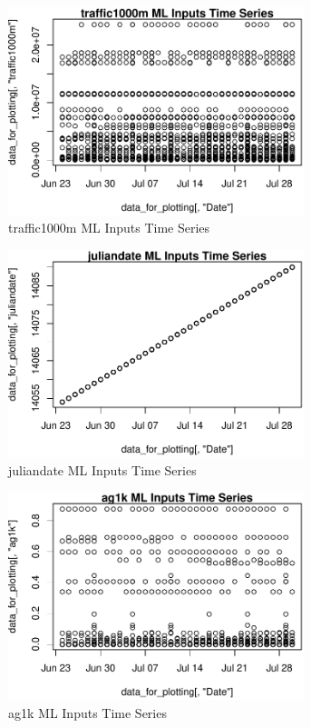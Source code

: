 \begin{figure} 
\centering  
\includegraphics[width=0.77\textwidth]{Code_Outputs/ML_input_report_AllforCaret_cleaned_StepPractice_part_practice_traffic1000mTS.pdf} 
\caption{\label{fig:ML_input_report_AllforCaret_cleaned_StepPractice_part_practicetraffic1000mTS}traffic1000m ML Inputs Time Series} 
\end{figure} 
 

\begin{figure} 
\centering  
\includegraphics[width=0.77\textwidth]{Code_Outputs/ML_input_report_AllforCaret_cleaned_StepPractice_part_practice_juliandateTS.pdf} 
\caption{\label{fig:ML_input_report_AllforCaret_cleaned_StepPractice_part_practicejuliandateTS}juliandate ML Inputs Time Series} 
\end{figure} 
 

\begin{figure} 
\centering  
\includegraphics[width=0.77\textwidth]{Code_Outputs/ML_input_report_AllforCaret_cleaned_StepPractice_part_practice_ag1kTS.pdf} 
\caption{\label{fig:ML_input_report_AllforCaret_cleaned_StepPractice_part_practiceag1kTS}ag1k ML Inputs Time Series} 
\end{figure} 
 

